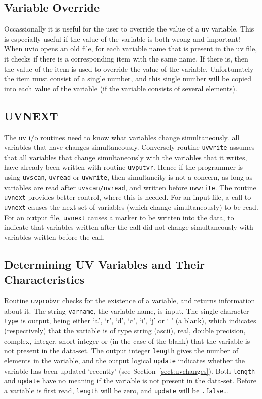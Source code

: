\subsection{Variable Override}
Occassionally it is useful for the user to override the value of a uv variable.
This is especially useful if the value of the variable is both wrong and
important! When uvio opens an old file, for each variable name that is
present in the uv file, it checks if there is a corresponding item with
the same name. If there is, then the value of the item is used to override the
value of the variable. Unfortunately the item must consist of a single
number, and this single number will be copied into each value of the variable
(if the variable consists of several elements).

\subsection{UVNEXT}\label{sect:uvnext}
The uv i/o routines need to know what variables change simultaneously.
all variables that have changes simultaneously. Conversely routine
{\tt uvwrite} assumes that all variables that change simultaneously with
the variables that it writes, have already been written with routine
{\tt uvputvr}. Hence if the programmer is using {\tt uvscan}, {\tt uvread} or
{\tt uvwrite}, then simultaneity is not a concern, as long as variables are
read after {\tt uvscan/uvread}, and written before {\tt uvwrite}. The routine
{\tt uvnext} provides better control, where this is needed. For an input
file, a call to {\tt uvnext} causes the next set of variables (which
change simultaneously) to be read. For an output file, {\tt uvnext} causes
a marker to be written into the data, to indicate that variables written
after the call did not change simultaneously with variables written before
the call.

\subsection{Determining UV Variables and Their Characteristics}
\label{sect:uvprobvr}
Routine {\tt uvprobvr} checks for the existence of a variable, and
returns information about it. The string {\tt varname}, the variable name,
is input. The single character {\tt type} is output, being either
`a', `r', `d', `c', `i', `j' or ` ' (a blank), which indicates (respectively)
that the variable is of type string (ascii),
real, double precision, complex, integer, short integer or (in the case of the
blank) that the variable is not present in the data-set.
The output integer {\tt length}
gives the number of elements in the variable, and the output logical
{\tt update} indicates whether the variable has been updated `recently' (see
Section~\ref{sect:uvchanges}).
Both {\tt length} and {\tt update} have no meaning if the variable is not
present in the data-set. Before a variable is first read,
{\tt length} will be zero, and {\tt update} will be {\tt .false.}.

